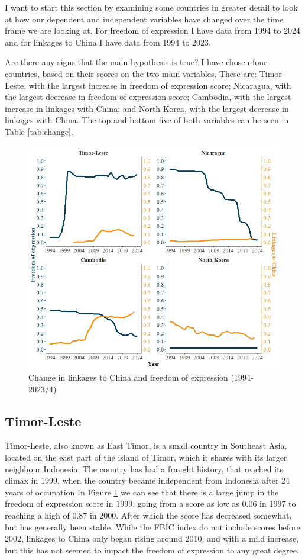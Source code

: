 I want to start this section by examining some countries in greater detail to look at how our dependent and independent variables have changed over the time frame we are looking at. For freedom of expression I have data from 1994 to 2024 and for linkages to China I have data from 1994 to 2023. 

Are there any signs that the main hypothesis is true? I have chosen four countries, based on their scores on the two main variables. These are: Timor-Leste, with the largest increase in freedom of expression score; Nicaragua, with the largest decrease in freedom of expression score; Cambodia, with the largest increase in linkages with China; and North Korea, with the largest decrease in linkages with China. The top and bottom five of both variables can be seen in Table \ref{tab:change}.

\begin{figure}[H]
    \centering
    \includegraphics[width=\linewidth]{graphics/single_country_plots.jpeg}
    \caption{Change in linkages to China and freedom of expression (1994-2023/4)}
    \label{fig:scp}
\end{figure}


\subsection{Timor-Leste}
Timor-Leste, also known as East Timor, is a small country in Southeast Asia, located on the east part of the island of Timor, which it shares with its larger neighbour Indonesia. The country has had a fraught history, that reached its climax in 1999, when the country became independent from Indonesia after 24 years of occupation \citep[p. 183]{kingsbury_democratic_2014} In Figure \ref{fig:scp} we can see that there is a large jump in the freedom of expression score in 1999, going from a score as low as 0.06 in 1997 to reaching a high of 0.87 in 2000. After which the score has decreased somewhat, but has generally been stable. While the FBIC index do not include scores before 2002, linkages to China only began rising around 2010, and with a mild increase, but this has not seemed to impact the freedom of expression to any great degree.

